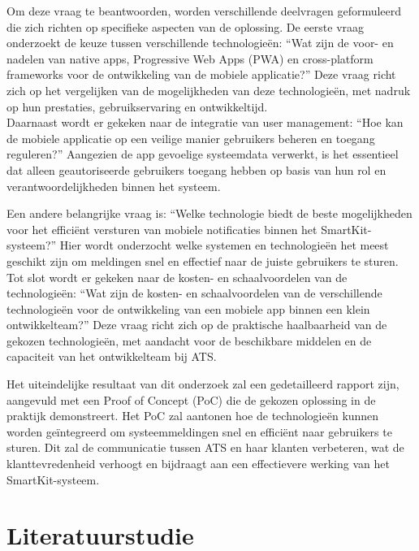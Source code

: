 \noindent Om deze vraag te beantwoorden, worden verschillende deelvragen geformuleerd die zich richten op specifieke aspecten van de oplossing. De eerste vraag onderzoekt de keuze tussen verschillende technologieën: “Wat zijn de voor- en nadelen van native apps, Progressive Web Apps (PWA) en cross-platform frameworks voor de ontwikkeling van de mobiele applicatie?” Deze vraag richt zich op het vergelijken van de mogelijkheden van deze technologieën, met nadruk op hun prestaties, gebruikservaring en ontwikkeltijd.\\

\noindent Daarnaast wordt er gekeken naar de integratie van user management: “Hoe kan de mobiele applicatie op een veilige manier gebruikers beheren en toegang reguleren?” Aangezien de app gevoelige systeemdata verwerkt, is het essentieel dat alleen geautoriseerde gebruikers toegang hebben op basis van hun rol en verantwoordelijkheden binnen het systeem.

\noindent Een andere belangrijke vraag is: “Welke technologie biedt de beste mogelijkheden voor het efficiënt versturen van mobiele notificaties binnen het SmartKit-systeem?” Hier wordt onderzocht welke systemen en technologieën het meest geschikt zijn om meldingen snel en effectief naar de juiste gebruikers te sturen.\\

\noindent Tot slot wordt er gekeken naar de kosten- en schaalvoordelen van de technologieën: “Wat zijn de kosten- en schaalvoordelen van de verschillende technologieën voor de ontwikkeling van een mobiele app binnen een klein ontwikkelteam?” Deze vraag richt zich op de praktische haalbaarheid van de gekozen technologieën, met aandacht voor de beschikbare middelen en de capaciteit van het ontwikkelteam bij ATS.

\noindent Het uiteindelijke resultaat van dit onderzoek zal een gedetailleerd rapport zijn, aangevuld met een Proof of Concept (PoC) die de gekozen oplossing in de praktijk demonstreert. Het PoC zal aantonen hoe de technologieën kunnen worden geïntegreerd om systeemmeldingen snel en efficiënt naar gebruikers te sturen. Dit zal de communicatie tussen ATS en haar klanten verbeteren, wat de klanttevredenheid verhoogt en bijdraagt aan een effectievere werking van het SmartKit-systeem.


\section{Literatuurstudie} %

